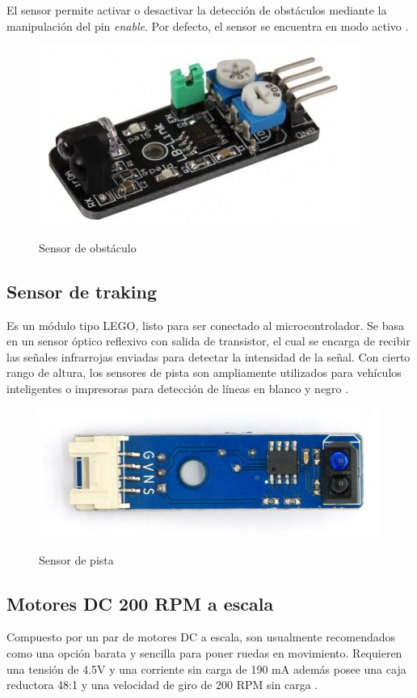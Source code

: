 El sensor permite activar o desactivar la detección de obstáculos mediante la manipulación del pin \textit{enable}. Por defecto, el sensor se encuentra en modo activo \cite{obstaculo}.

\begin{figure}[H]
    \centering
    \includegraphics[width = 7 cm]{imagenes/obstacle.PNG}
    \caption{Sensor de obstáculo}
    \cite{obstaculo}
\end{figure}

\subsection{Sensor de traking}
Es un módulo tipo LEGO, listo para ser conectado al microcontrolador. Se basa en un sensor óptico reflexivo con salida de transistor, el cual se encarga de recibir las señales infrarrojas enviadas para detectar la intensidad de la señal. Con cierto rango de altura, los sensores de pista son ampliamente utilizados para vehículos inteligentes o impresoras para detección de líneas en blanco y negro \cite{track}.

\begin{figure}[H]
    \centering
    \includegraphics[width = 7 cm]{imagenes/tracking.png}
    \caption{Sensor de pista}
    \cite{track}
\end{figure}


\subsection{Motores DC 200 RPM a escala}
Compuesto por un par de motores DC a escala, son usualmente recomendados como una opción barata y sencilla para poner ruedas en movimiento. Requieren una tensión de 4.5V y una corriente sin carga de 190 mA además posee una caja reductora 48:1 y una velocidad de giro de 200 RPM sin carga \cite{motor_dc}.

